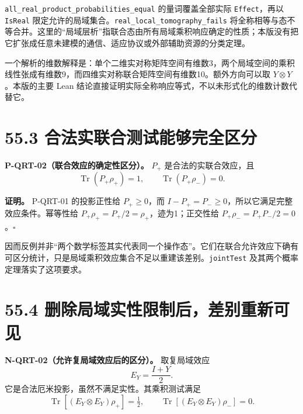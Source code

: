 \documentclass[
  11pt,
  oneside]{book}
\begin{document}
\texttt{all\_\allowbreak real\_\allowbreak product\_\allowbreak probabilities\_\allowbreak equal} 的量词覆盖全部实际
\texttt{Effect}，再以 \texttt{IsReal}
限定允许的局域集合。\texttt{real\_\allowbreak local\_\allowbreak tomography\_\allowbreak fails}
将全称相等与态不等合并。这里的``局域层析''指联合态由所有局域乘积响应确定的性质；本版没有把它扩张成任意未建模的通信、适应协议或外部辅助资源的分类定理。

一个解析的维数解释是：单个二维实对称矩阵空间有维数3，两个局域空间的乘积线性张成有维数9，而四维实对称联合矩阵空间有维数10。额外方向可以取
\(Y\otimes Y\)。本版的主要 Lean
结论直接证明实际全称响应等式，不以未形式化的维数计数代替它。

\hypertarget{ux5408ux6cd5ux5b9eux8054ux5408ux6d4bux8bd5ux80fdux591fux5b8cux5168ux533aux5206}{%
\section{55.3
合法实联合测试能够完全区分}\label{ux5408ux6cd5ux5b9eux8054ux5408ux6d4bux8bd5ux80fdux591fux5b8cux5168ux533aux5206}}

\protect\hypertarget{p-qrt-02}{}{}

\textbf{P-QRT-02（联合效应的确定性区分）。} \(P_+\)
是合法的实联合效应，且 \[
\operatorname{Tr}(P_+\rho_+)=1,\qquad
\operatorname{Tr}(P_+\rho_-)=0.
\]

\textbf{证明。} P-QRT-01 的投影正性给 \(P_+\ge0\)，而
\(I-P_+=P_-\ge0\)，所以它满足完整效应条件。幂等性给
\(P_+\rho_+=P_+/2=\rho_+\)，迹为1；正交性给
\(P_+\rho_-=P_+P_-/2=0\)。\(\square\)

因而反例并非``两个数学标签其实代表同一个操作态''。它们在联合允许效应下确有可区分统计，只是局域乘积效应集合不足以重建该差别。\texttt{jointTest}
及其两个概率定理落实了这项要求。

\hypertarget{ux5220ux9664ux5c40ux57dfux5b9eux6027ux9650ux5236ux540eux5deeux522bux91cdux65b0ux53efux89c1}{%
\section{55.4
删除局域实性限制后，差别重新可见}\label{ux5220ux9664ux5c40ux57dfux5b9eux6027ux9650ux5236ux540eux5deeux522bux91cdux65b0ux53efux89c1}}

\protect\hypertarget{n-qrt-02}{}{}

\textbf{N-QRT-02（允许复局域效应后的区分）。} 取复局域效应 \[
E_Y=\frac{I+Y}{2}.
\] 它是合法厄米投影，虽然不满足实性。其乘积测试满足 \[
\operatorname{Tr}[(E_Y\otimes E_Y)\rho_+]=\tfrac12,
\qquad \operatorname{Tr}[(E_Y\otimes E_Y)\rho_-]=0.
\]
\end{document}
